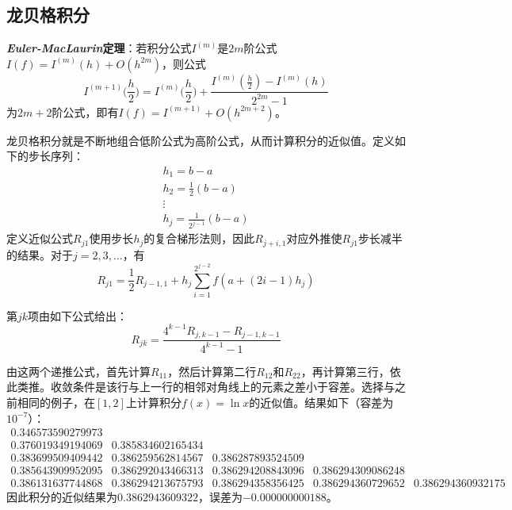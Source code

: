 \documentclass{ctexart}
\begin{document}
\subsection{龙贝格积分}
\textbf{\textit{Euler-MacLaurin}定理}：若积分公式$I^{(m)}$是$2m$阶公式$I(f)=I^{(m)}(h)+O(h^{2m})$，则公式
\[
I^{(m+1)}\Big(\frac{h}{2}\Big) = I^{(m)}\Big(\frac{h}{2}\Big) + \frac{I^{(m)}\left(\frac{h}{2}\right) - I^{(m)}(h)}{2^{2m} - 1}
\]
为$2m+2$阶公式，即有$I(f)=I^{(m+1)}+O(h^{2m+2})$。

龙贝格积分就是不断地组合低阶公式为高阶公式，从而计算积分的近似值。定义如下的步长序列：
\[
\begin{matrix}
h_1 = b - a \\
h_2 = \frac{1}{2}(b - a) \\
\vdots \\
h_j = \frac{1}{2^{j-1}}(b - a)
\end{matrix}
\]
定义近似公式$R_{j1}$使用步长$h_j$的复合梯形法则，因此$R_{j+i,1}$对应外推使$R_{j1}$步长减半的结果。对于$j=2,3,\ldots$，有
\[
R_{j1} = \frac{1}{2}R_{j-1,1} + h_j \sum\limits_{i=1}^{2^{j-2}} f(a + (2i - 1)h_j)
\]

第$jk$项由如下公式给出：
\[
R_{jk} = \frac{4^{k-1}R_{j,k-1} - R_{j-1,k-1}}{4^{k-1} - 1}
\]

由这两个递推公式，首先计算$R_{11}$，然后计算第二行$R_{12}$和$R_{22}$，再计算第三行，依此类推。收敛条件是该行与上一行的相邻对角线上的元素之差小于容差。选择与之前相同的例子，在$[1,2]$上计算积分$f(x)=\ln{x}$的近似值。结果如下（容差为$10^{-7}$）：
\[
\begin{matrix}
  0.346573590279973 &                   &                   &                   &                   \\
  0.376019349194069 & 0.385834602165434 &                   &                   &                   \\
  0.383699509409442 & 0.386259562814567 & 0.386287893524509 &                   &                   \\
  0.385643909952095 & 0.386292043466313 & 0.386294208843096 & 0.386294309086248 &                   \\
  0.386131637744868 & 0.386294213675793 & 0.386294358356425 & 0.386294360729652 & 0.386294360932175
\end{matrix}
\]
因此积分的近似结果为$0.3862943609322$，误差为$-0.000000000188$。
\end{document}
